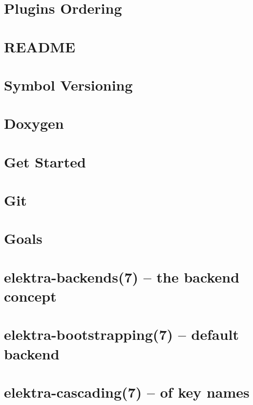 \let\mypdfximage\pdfximage\def\pdfximage{\immediate\mypdfximage}\documentclass[twoside]{book}
\newcommand{\+}{\discretionary{\mbox{\scriptsize$\hookleftarrow$}}{}{}}
\begin{document}
\chapter{Plugins Ordering}
\label{doc_dev_plugins-ordering_md}

\chapter{README}
\label{md_doc_dev_README}

\chapter{Symbol Versioning}
\label{doc_dev_symbol-versioning_md}

\chapter{Doxygen}
\label{doc_doxygen_README_md}

\chapter{Get Started}
\label{doc_GETSTARTED_md}

\chapter{Git}
\label{doc_Git_md}

\chapter{Goals}
\label{doc_GOALS_md}

\chapter{elektra-\/backends(7) -- the backend concept}
\label{doc_help_elektra-backends_md}

\chapter{elektra-\/bootstrapping(7) -- default backend}
\label{doc_help_elektra-bootstrapping_md}

\chapter{elektra-\/cascading(7) -- of key names}
\label{doc_help_elektra-cascading_md}

\end{document}
